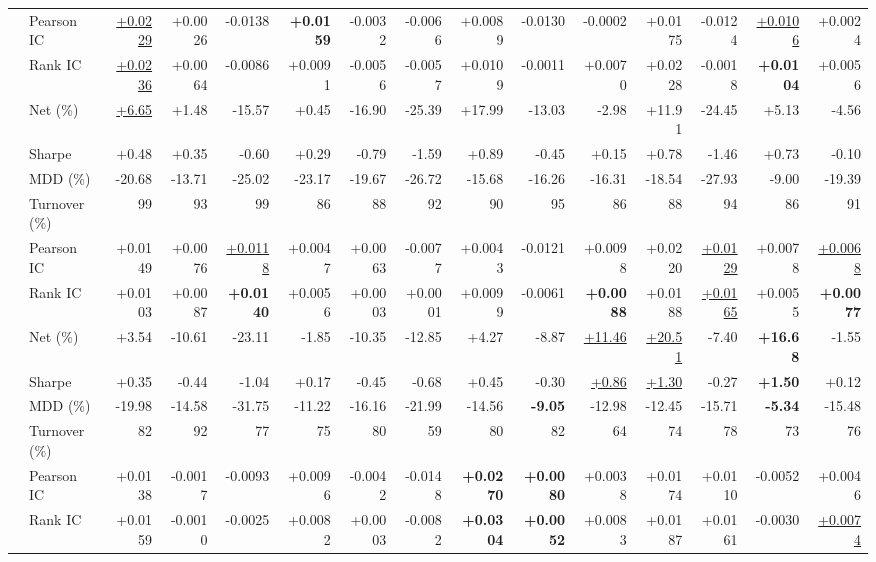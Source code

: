 \begin{table}[t]
{\begin{tabular}{llrrrrrrrrrrrrr}
\addlinespace
\multirow{6}{*}{GRU-i $511$}
 & Pearson IC   & \underline{+0.0229} & +0.0026 & -0.0138 & \textbf{+0.0159} & -0.0032 & -0.0066 & +0.0089 & -0.0130 & -0.0002 & +0.0175 & -0.0124 & \underline{+0.0106} & +0.0024 \\
 & Rank IC      & \underline{+0.0236} & +0.0064 & -0.0086 & +0.0091 & -0.0056 & -0.0057 & +0.0109 & -0.0011 & +0.0070 & +0.0228 & -0.0018 & \textbf{+0.0104} & +0.0056 \\
 & Net (\%)     & \underline{+6.65} & +1.48 & -15.57 & +0.45 & -16.90 & -25.39 & +17.99 & -13.03 & -2.98 & +11.91 & -24.45 & +5.13 & -4.56 \\
 & Sharpe       & +0.48 & +0.35 & -0.60 & +0.29 & -0.79 & -1.59 & +0.89 & -0.45 & +0.15 & +0.78 & -1.46 & +0.73 & -0.10 \\
 & MDD (\%)     & -20.68 & -13.71 & -25.02 & -23.17 & -19.67 & -26.72 & -15.68 & -16.26 & -16.31 & -18.54 & -27.93 & -9.00 & -19.39 \\
 & Turnover (\%)& 99 & 93 & 99 & 86 & 88 & 92 & 90 & 95 & 86 & 88 & 94 & 86 & 91 \\
\addlinespace
\multirow{6}{*}{PatchTST $16{,}836$}
 & Pearson IC   & +0.0149 & +0.0076 & \underline{+0.0118} & +0.0047 & +0.0063 & -0.0077 & +0.0043 & -0.0121 & +0.0098 & +0.0220 & \underline{+0.0129} & +0.0078 & \underline{+0.0068} \\
 & Rank IC      & +0.0103 & +0.0087 & \textbf{+0.0140} & +0.0056 & +0.0003 & +0.0001 & +0.0099 & -0.0061 & \textbf{+0.0088} & +0.0188 & \underline{+0.0165} & +0.0055 & \textbf{+0.0077} \\
 & Net (\%)     & +3.54 & -10.61 & -23.11 & -1.85 & -10.35 & -12.85 & +4.27 & -8.87 & \underline{+11.46} & \underline{+20.51} & -7.40 & \textbf{+16.68} & -1.55 \\
 & Sharpe       & +0.35 & -0.44 & -1.04 & +0.17 & -0.45 & -0.68 & +0.45 & -0.30 & \underline{+0.86} & \underline{+1.30} & -0.27 & \textbf{+1.50} & +0.12 \\
 & MDD (\%)     & -19.98 & -14.58 & -31.75 & -11.22 & -16.16 & -21.99 & -14.56 & \textbf{-9.05} & -12.98 & -12.45 & -15.71 & \textbf{-5.34} & -15.48 \\
 & Turnover (\%)& 82 & 92 & 77 & 75 & 80 & 59 & 80 & 82 & 64 & 74 & 78 & 73 & 76 \\
\addlinespace
\multirow{6}{*}{iTransf. $817{,}153$}
 & Pearson IC   & +0.0138 & -0.0017 & -0.0093 & +0.0096 & -0.0042 & -0.0148 & \textbf{+0.0270} & \textbf{+0.0080} & +0.0038 & +0.0174 & +0.0110 & -0.0052 & +0.0046 \\
 & Rank IC      & +0.0159 & -0.0010 & -0.0025 & +0.0082 & +0.0003 & -0.0082 & \textbf{+0.0304} & \textbf{+0.0052} & +0.0083 & +0.0187 & +0.0161 & -0.0030 & \underline{+0.0074} \\

\end{tabular}}
\end{table}
